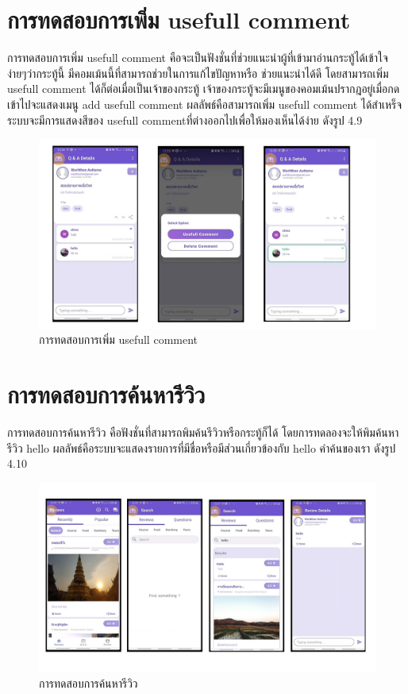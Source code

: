 \section{การทดสอบการเพิ่ม usefull comment}
การทดสอบการเพิ่ม usefull comment คือจะเป็นฟังชั่นที่ช่วยแนะนำผู้ที่เข้ามาอ่านกระทู้ได้เข้าใจง่ายๆว่ากระทู้นี้ มีคอมเม้นนี้ที่สามารถช่วยในการแก้ไขปัญหาหรือ
ช่วยแนะนำได้ดี โดยสามารถเพิ่ม usefull comment ได้ก็ต่อเมื่อเป็นเจ้าของกระทู้ เจ้าของกระทู้จะมีเมนูของคอมเม้นปรากฎอยู่เมื่อกดเข้าไปจะแสดงเมนู add usefull comment 
ผลลัพธ์คือสามารถเพิ่ม usefull comment ได้สำเหร็จ ระบบจะมีการแสดงสีของ usefull commentที่ต่างออกไปเพื่อให้มองเห็นได้ง่าย  ดังรูป 4.9

\begin{figure}
    \begin{center}
      \includegraphics[width=1\textwidth]{./image/testing/Slide10.JPG}
    \end{center}
    \caption[การทดสอบการเพิ่ม usefull comment]{การทดสอบการเพิ่ม usefull comment}
    \end{figure}

\section{การทดสอบการค้นหารีวิว}
การทดสอบการค้นหารีวิว คือฟังชั่นที่สามารถพิมค้นรีวิวหรือกระทู้ก็ได้ โดยการทดลองจะให้พิมค้นหารีวิว hello  
ผลลัพธ์คือระบบจะแสดงรายการที่มีชื่อหรือมีส่วนเกี่ยวข้องกับ hello คำค้นของเรา  ดังรูป 4.10

\begin{figure}
    \begin{center}
      \includegraphics[width=1\textwidth]{./image/testing/Slide11.JPG}
    \end{center}
    \caption[การทดสอบการค้นหารีวิว]{การทดสอบการค้นหารีวิว}
    \end{figure}

